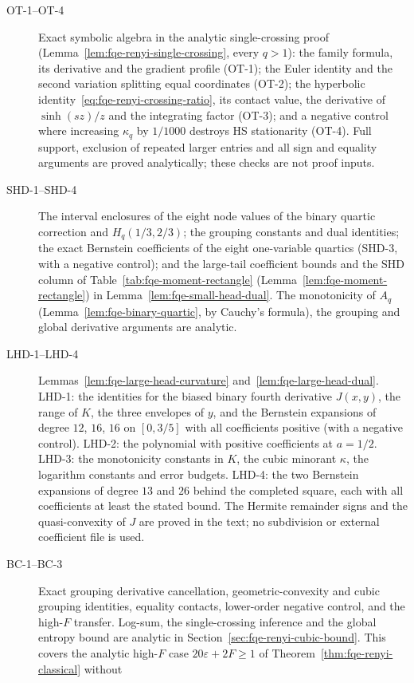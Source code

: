 \begin{description}
\item[OT-1--OT-4] Exact symbolic algebra in the analytic single-crossing proof
(Lemma~\ref{lem:fqe-renyi-single-crossing}, every $q>1$): the family formula, its derivative and the gradient profile (OT-1);
the Euler identity and the second variation splitting equal coordinates (OT-2);
the hyperbolic identity~\eqref{eq:fqe-renyi-crossing-ratio}, its contact value, the derivative of $\sinh(sz)/z$
and the integrating factor (OT-3); and a negative control where increasing $\kappa_q$ by $1/1000$ destroys HS
stationarity (OT-4). Full support, exclusion of repeated larger entries and all sign and equality arguments are
proved analytically; these checks are not proof inputs.
\item[SHD-1--SHD-4] The interval enclosures of the eight node values of the binary
quartic correction and $H_q(1/3,2/3)$; the grouping
constants and dual identities; the exact Bernstein coefficients of the eight one-variable quartics (SHD-3, with a negative
control); and the large-tail coefficient bounds and the SHD column of
Table~\ref{tab:fqe-moment-rectangle} (Lemma~\ref{lem:fqe-moment-rectangle}) in
Lemma~\ref{lem:fqe-small-head-dual}. The monotonicity of $A_q$ (Lemma~\ref{lem:fqe-binary-quartic}, by Cauchy's
formula), the grouping
and global derivative arguments are analytic.
\item[LHD-1--LHD-4] Lemmas~\ref{lem:fqe-large-head-curvature} and~\ref{lem:fqe-large-head-dual}.
LHD-1: the identities for the biased binary fourth derivative $J(x,y)$, the range of $K$, the three envelopes
of $y$, and the Bernstein expansions of degree $12$, $16$, $16$ on $[0,3/5]$ with all coefficients positive (with a negative control).
LHD-2: the polynomial with positive coefficients at $a=1/2$.
LHD-3: the monotonicity constants in $K$, the cubic minorant $\kappa$, the logarithm constants and error budgets.
LHD-4: the two Bernstein expansions of degree $13$ and $26$ behind the completed square, each with all coefficients
at least the stated bound. The Hermite remainder signs and the quasi-convexity of $J$ are proved in the text; no
subdivision or external coefficient file is used.
\item[BC-1--BC-3] Exact grouping derivative cancellation, geometric-convexity
and cubic grouping identities, equality contacts, lower-order negative control,
and the high-$F$ transfer. Log-sum, the single-crossing inference and the global
entropy bound are analytic in Section~\ref{sec:fqe-renyi-cubic-bound}.
This covers the analytic high-$F$ case $20\varepsilon+2F\ge1$ of Theorem~\ref{thm:fqe-renyi-classical} without

\end{description}
